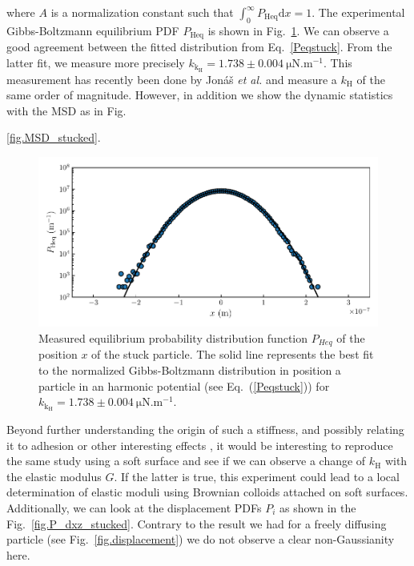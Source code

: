 where $A$ is a normalization constant such that $\int _0 ^\infty P_\mathrm{Heq}\mathrm{d}x =1$. The experimental Gibbs-Boltzmann equilibrium \gls{PDF} $P_\mathrm{Heq}$ is shown in Fig.~\ref{fig.pdfstuck}. We can observe a good agreement between the fitted distribution from Eq.~\ref{Peqstuck}. From the latter fit, we measure more precisely $k_\mathrm{k_\mathrm{H}} = 1.738 \pm 0.004 ~\mathrm{\mu N . m^{-1}}$. This measurement has recently been done by Jonáš \textit{et al.} \cite{jonas_mechanical_2019} and measure a $k_\mathrm{H}$ of the same order of magnitude. However, in addition we show the dynamic statistics with the \gls{MSD} as in Fig.~{\ref{fig.MSD_stucked}.

\begin{figure}
		\includegraphics{02_body/chapter4/images/stucked_particle/Peq_stuck.pdf}
		\caption{Measured equilibrium probability distribution function $P_{Heq}$ of the position $x$ of the stuck particle. The solid line represents the best fit to the normalized Gibbs-Boltzmann distribution in position a particle in an harmonic potential (see Eq.~(\ref{Peqstuck})) for $k_\mathrm{k_\mathrm{H}} = 1.738 \pm 0.004 ~\mathrm{\mu N . m^{-1}}$.}
		\label{fig.pdfstuck}
\end{figure}
Beyond further understanding the origin of such a stiffness, and possibly relating it to adhesion or other interesting effects \cite{jonas_mechanical_2019}, it would be interesting to reproduce the same study using a soft surface and see if we can observe a change of $k_\mathrm{H}$ with the elastic modulus $G$. If the latter is true, this experiment could lead to a local determination of elastic moduli using Brownian colloids attached on soft surfaces. Additionally, we can look at the displacement \gls{PDF}s $P_i$ as shown in the Fig.~\ref{fig.P_dxz_stucked}. Contrary to the result we had for a freely diffusing particle (see Fig.~\ref{fig.displacement}) we do not observe a clear non-Gaussianity here. 

}
